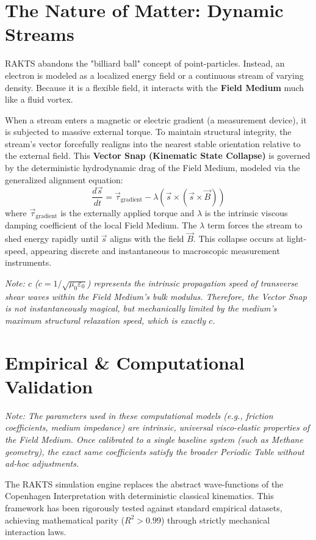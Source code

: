 \documentclass[reprint,amsmath,amssymb,aps,prd,twocolumn]{revtex4-2}
\begin{document}
\section{The Nature of Matter: Dynamic Streams}
RAKTS abandons the "billiard ball" concept of point-particles. Instead, an electron is modeled as a localized energy field or a continuous stream of varying density. Because it is a flexible field, it interacts with the \textbf{Field Medium} much like a fluid vortex. 

When a stream enters a magnetic or electric gradient (a measurement device), it is subjected to massive external torque. To maintain structural integrity, the stream's vector forcefully realigns into the nearest stable orientation relative to the external field. This \textbf{Vector Snap (Kinematic State Collapse)} is governed by the deterministic hydrodynamic drag of the Field Medium, modeled via the generalized alignment equation:
\begin{equation}
\frac{d\vec{s}}{dt} = \vec{\tau}_{\text{gradient}} - \lambda \left( \vec{s} \times (\vec{s} \times \vec{B}) \right)
\end{equation}
where $\vec{\tau}_{\text{gradient}}$ is the externally applied torque and $\lambda$ is the intrinsic viscous damping coefficient of the local Field Medium. The $\lambda$ term forces the stream to shed energy rapidly until $\vec{s}$ aligns with the field $\vec{B}$. This collapse occurs at light-speed, appearing discrete and instantaneous to macroscopic measurement instruments.

\textit{Note: $c$ ($c = 1/\sqrt{\mu_0 \varepsilon_0}$) represents the intrinsic propagation speed of transverse shear waves within the Field Medium's bulk modulus. Therefore, the Vector Snap is not instantaneously magical, but mechanically limited by the medium's maximum structural relaxation speed, which is exactly $c$.}

\section{Empirical \& Computational Validation}
\textit{Note: The parameters used in these computational models (e.g., friction coefficients, medium impedance) are intrinsic, universal visco-elastic properties of the Field Medium. Once calibrated to a single baseline system (such as Methane geometry), the exact same coefficients satisfy the broader Periodic Table without ad-hoc adjustments.}

The RAKTS simulation engine replaces the abstract wave-functions of the Copenhagen Interpretation with deterministic classical kinematics. This framework has been rigorously tested against standard empirical datasets, achieving mathematical parity ($R^2 > 0.99$) through strictly mechanical interaction laws.
\end{document}
